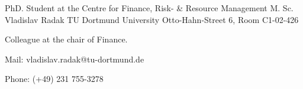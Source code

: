

\begin{cventries}



  \cventry
    {PhD. Student at the Centre for Finance, Risk- \& Resource Management} %
    {M. Sc. Vladislav Radak} %
    {TU Dortmund University} %
    {Otto-Hahn-Street 6, Room C1-02-426} %
    {
      \begin{cvitems} %
        \item {Colleague at the chair of Finance.}
        \item {Mail: vladislav.radak@tu-dortmund.de}
        \item {Phone: (+49) 231 755-3278}
      \end{cvitems}
    }


\end{cventries}
